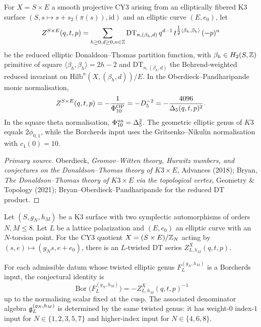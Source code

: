 \begin{theorem}[$N=1$ Donaldson--Thomas / Siegel product identity]
\label{thm:dt-siegel-N1}
For $X = S \times E$ a smooth projective CY3 arising from an elliptically fibered K3 surface $(S, s \mapsto s + s_2(\pi(s)), \mathrm{id})$ and an elliptic curve $(E, e_0)$, let
\[
  Z^{S \times E}(q, t, p) = \sum_{h \geq 0, d \geq 0, n \in \mathbb{Z}} \mathrm{DT}_{n, (\beta_h, d)}\, q^{d - 1}\, t^{\tfrac{1}{2}\langle \beta_h, \beta_h\rangle}\, (-p)^n
\]
be the reduced elliptic Donaldson--Thomas partition function, with
$\beta_h\in H_2(S,\mathbb{Z})$ primitive of square
$\langle\beta_h,\beta_h\rangle=2h-2$ and
$\mathrm{DT}_{n,(\beta_h,d)}$ the Behrend-weighted reduced invariant
on $\mathrm{Hilb}^n(X,(\beta_h,d))/E$. In the Oberdieck--Pandharipande
monic normalisation,
\[
  Z^{S\times E}(q,t,p)
  =
  -\frac{1}{\Phi_{10}^{\mathrm{OP}}}
  =
  -D_5^{-2}
  =
  -\frac{4096}{\Delta_5(q,t,p)^2}.
\]
In the square theta normalisation,
$\Phi_{10}^{\mathrm{un}}=\Delta_5^2$. The geometric elliptic genus of
$K3$ equals $2\phi_{0,1}$, while the Borcherds input uses the
Gritsenko--Nikulin normalisation with $c_1(0)=10$.
\end{theorem}
\begin{proof}[Primary source]
Oberdieck, \emph{Gromov--Witten theory, Hurwitz numbers, and
conjectures on the Donaldson--Thomas theory of $K3 \times E$},
Advances (2018); Bryan, \emph{The Donaldson--Thomas theory of
$K3 \times E$ via the topological vertex}, Geometry \& Topology
(2021); Bryan--Oberdieck--Pandharipande for the reduced DT product.
\end{proof}

\begin{conjecture}
\label{conj:twisted-atlas}
Let $(S, g_N, h_M)$ be a K3 surface with two symplectic automorphisms of orders $N, M \leq 8$. Let $L$ be a lattice polarization and $(E, e_0)$ an elliptic curve with an $N$-torsion point. For the CY3 quotient $X = (S \times E)/\mathbb{Z}_N$ acting by $(s, e) \mapsto (g_N s, e + e_0)$, there is an $L$-twisted DT series $Z^X_{L, h_M}(q, t, p)$.

For each admissible datum whose twisted elliptic genus
$F_L^{(g_N,h_M)}$ is a Borcherds input, the conjectural identity is
\[
  \operatorname{Bor}\bigl(F_L^{(g_N,h_M)}\bigr)
  =
  -Z^X_{L,h_M}(q,t,p)^{-1}
\]
up to the normalising scalar fixed at the cusp. The associated
denominator algebra $\mathfrak{g}^{(g_N,h_M)}_L$ is determined by the same twisted genus:
it has weight-$0$ index-$1$ input for $N\in\{1,2,3,5,7\}$ and
higher-index input for $N\in\{4,6,8\}$.
\end{conjecture}

